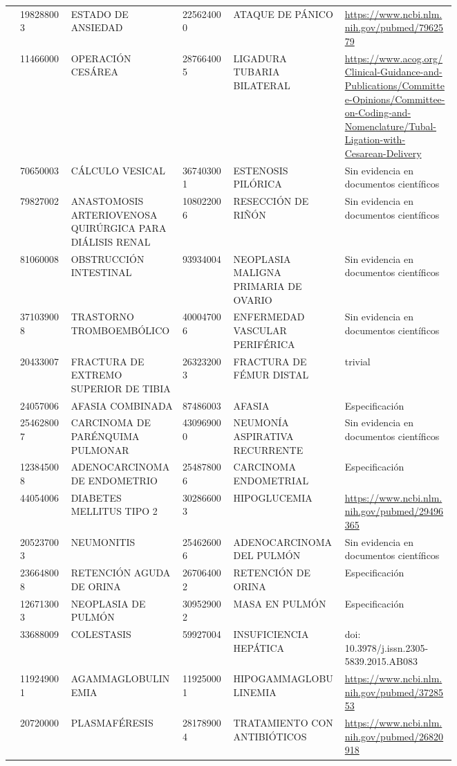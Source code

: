 \begin{landscape}
\begin{longtable}[c]{@{}llp{0.25\linewidth}lp{0.25\linewidth}p{0.25\linewidth}@{}}
 & 198288003 & ESTADO DE ANSIEDAD & 225624000 & ATAQUE DE PÁNICO & \url{https://www.ncbi.nlm.nih.gov/pubmed/7962579} \\
 & 11466000 & OPERACIÓN CESÁREA & 287664005 & LIGADURA TUBARIA BILATERAL & \url{https://www.acog.org/Clinical-Guidance-and-Publications/Committee-Opinions/Committee-on-Coding-and-Nomenclature/Tubal-Ligation-with-Cesarean-Delivery} \\
 & 70650003 & CÁLCULO VESICAL & 367403001 & ESTENOSIS PILÓRICA & Sin evidencia en documentos científicos \\
 & 79827002 & ANASTOMOSIS ARTERIOVENOSA QUIRÚRGICA PARA DIÁLISIS RENAL & 108022006 & RESECCIÓN DE RIÑÓN & Sin evidencia en documentos científicos \\
 & 81060008 & OBSTRUCCIÓN INTESTINAL & 93934004 & NEOPLASIA MALIGNA PRIMARIA DE OVARIO & Sin evidencia en documentos científicos \\
 & 371039008 & TRASTORNO TROMBOEMBÓLICO & 400047006 & ENFERMEDAD VASCULAR PERIFÉRICA & Sin evidencia en documentos científicos \\
 & 20433007 & FRACTURA DE EXTREMO SUPERIOR DE TIBIA & 263232003 & FRACTURA DE FÉMUR DISTAL & trivial \\
 & 24057006 & AFASIA COMBINADA & 87486003 & AFASIA & Especificación \\
 & 254628007 & CARCINOMA DE PARÉNQUIMA PULMONAR & 430969000 & NEUMONÍA ASPIRATIVA RECURRENTE & Sin evidencia en documentos científicos \\
 & 123845008 & ADENOCARCINOMA DE ENDOMETRIO & 254878006 & CARCINOMA ENDOMETRIAL & Especificación \\
 & 44054006 & DIABETES MELLITUS TIPO 2 & 302866003 & HIPOGLUCEMIA & \url{https://www.ncbi.nlm.nih.gov/pubmed/29496365} \\
 & 205237003 & NEUMONITIS & 254626006 & ADENOCARCINOMA DEL PULMÓN & Sin evidencia en documentos científicos \\
 & 236648008 & RETENCIÓN AGUDA DE ORINA & 267064002 & RETENCIÓN DE ORINA & Especificación \\
 & 126713003 & NEOPLASIA DE PULMÓN & 309529002 & MASA EN PULMÓN & Especificación \\
 & 33688009 & COLESTASIS & 59927004 & INSUFICIENCIA HEPÁTICA & doi:  10.3978/j.issn.2305-5839.2015.AB083 \\
 & 119249001 & AGAMMAGLOBULINEMIA & 119250001 & HIPOGAMMAGLOBULINEMIA & \url{https://www.ncbi.nlm.nih.gov/pubmed/3728553} \\
 & 20720000 & PLASMAFÉRESIS & 281789004 & TRATAMIENTO CON ANTIBIÓTICOS & \url{https://www.ncbi.nlm.nih.gov/pubmed/26820918} \\

\end{longtable}
\end{landscape}
